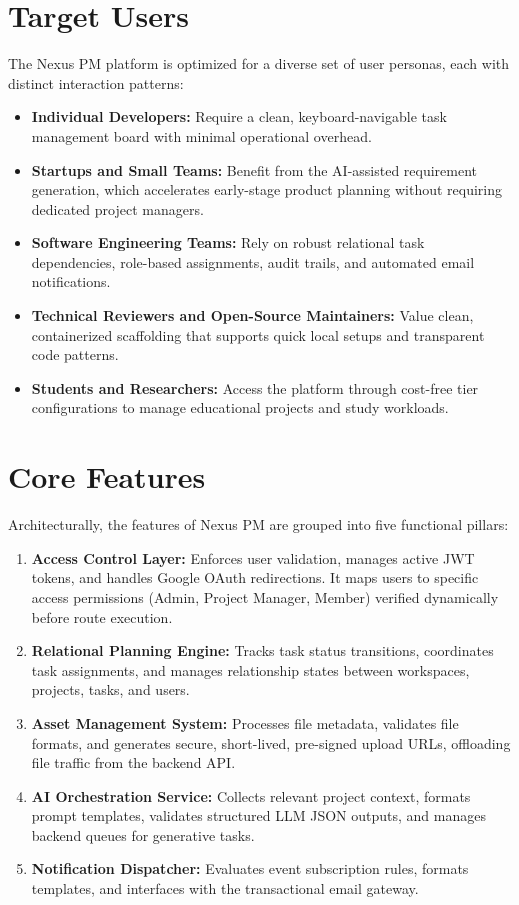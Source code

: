\section{Target Users}
The Nexus PM platform is optimized for a diverse set of user personas, each with distinct interaction patterns:
\begin{itemize}
    \item \textbf{Individual Developers:} Require a clean, keyboard-navigable task management board with minimal operational overhead.
    \item \textbf{Startups and Small Teams:} Benefit from the AI-assisted requirement generation, which accelerates early-stage product planning without requiring dedicated project managers.
    \item \textbf{Software Engineering Teams:} Rely on robust relational task dependencies, role-based assignments, audit trails, and automated email notifications.
    \item \textbf{Technical Reviewers and Open-Source Maintainers:} Value clean, containerized scaffolding that supports quick local setups and transparent code patterns.
    \item \textbf{Students and Researchers:} Access the platform through cost-free tier configurations to manage educational projects and study workloads.
\end{itemize}

\section{Core Features}
Architecturally, the features of Nexus PM are grouped into five functional pillars:
\begin{enumerate}
    \item \textbf{Access Control Layer:} Enforces user validation, manages active JWT tokens, and handles Google OAuth redirections. It maps users to specific access permissions (Admin, Project Manager, Member) verified dynamically before route execution.
    \item \textbf{Relational Planning Engine:} Tracks task status transitions, coordinates task assignments, and manages relationship states between workspaces, projects, tasks, and users.
    \item \textbf{Asset Management System:} Processes file metadata, validates file formats, and generates secure, short-lived, pre-signed upload URLs, offloading file traffic from the backend API.
    \item \textbf{AI Orchestration Service:} Collects relevant project context, formats prompt templates, validates structured LLM JSON outputs, and manages backend queues for generative tasks.
    \item \textbf{Notification Dispatcher:} Evaluates event subscription rules, formats templates, and interfaces with the transactional email gateway.
\end{enumerate}

